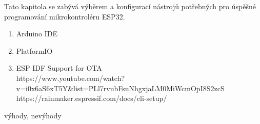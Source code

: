 
Tato kapitola se zabývá výběrem a konfigurací nástrojů potřebných pro úspěšné programování mikrokontroléru ESP32.

\begin{enumerate}
	\item Arduino IDE
	\item PlatformIO
	\item ESP IDF
	      Support for OTA\\
	      https://www.youtube.com/watch?v=i0x6aS6xT5Y&list=PLl7rvubFsuNhgxjaLM0MiWcmOpI8S2zcS\\
          https://rainmaker.espressif.com/docs/cli-setup/\\
\end{enumerate}
výhody, nevýhody